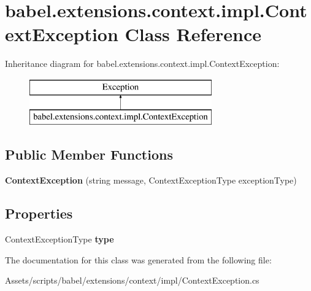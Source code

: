 \hypertarget{classbabel_1_1extensions_1_1context_1_1impl_1_1_context_exception}{\section{babel.\-extensions.\-context.\-impl.\-Context\-Exception Class Reference}
\label{classbabel_1_1extensions_1_1context_1_1impl_1_1_context_exception}
}
Inheritance diagram for babel.\-extensions.\-context.\-impl.\-Context\-Exception\-:\begin{figure}[H]
\begin{center}
\leavevmode
\includegraphics[height=2.000000cm]{classbabel_1_1extensions_1_1context_1_1impl_1_1_context_exception}
\end{center}
\end{figure}
\subsection*{Public Member Functions}
\begin{DoxyCompactItemize}
\item 
\hypertarget{classbabel_1_1extensions_1_1context_1_1impl_1_1_context_exception_af47ccb8ca840279eb088455ababeea19}{{\bfseries Context\-Exception} (string message, Context\-Exception\-Type exception\-Type)}\label{classbabel_1_1extensions_1_1context_1_1impl_1_1_context_exception_af47ccb8ca840279eb088455ababeea19}

\end{DoxyCompactItemize}
\subsection*{Properties}
\begin{DoxyCompactItemize}
\item 
\hypertarget{classbabel_1_1extensions_1_1context_1_1impl_1_1_context_exception_a6fd91528b2a1dc39d0c5a96999c95dce}{Context\-Exception\-Type {\bfseries type}}\label{classbabel_1_1extensions_1_1context_1_1impl_1_1_context_exception_a6fd91528b2a1dc39d0c5a96999c95dce}

\end{DoxyCompactItemize}


The documentation for this class was generated from the following file\-:\begin{DoxyCompactItemize}
\item 
Assets/scripts/babel/extensions/context/impl/Context\-Exception.\-cs\end{DoxyCompactItemize}
